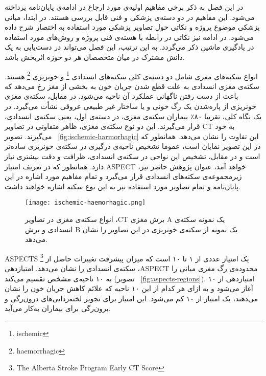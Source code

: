

در این فصل به ذکر برخی مفاهیم اولیه‌ی مورد ارجاع در ادامه‌ی پایان‌نامه پرداخته می‌شود.
این مفاهیم در دو دسته‌ی پزشکی و فنی قابل بررسی هستند.
در ابتدا، مبانی پزشکی موضوع پروژه و نکاتی حول تصاویر پزشکی مورد استفاده به اختصار شرح داده می‌شود.
در ادامه نیز نکاتی در رابطه با هسته‌ی فنی پروژه و روش‌های مورد استفاده در یادگیری ماشین ذکر می‌گردد.
به این ترتیب، این فصل می‌تواند در دست‌یابی به یک دانش مشترک در میان متخصصان هر دو حوزه اثربخش باشد.



انواع سکته‌های مغزی شامل دو دسته‌ی کلی سکته‌های انسدادی
\footnote{ischemic}
و خونریزی
\footnote{haemorrhagic} 
هستند.
سکته‌ی مغزی انسدادی به علت قطع شدن جریان خون به بخشی از مغز رخ می‌دهد که باعث از دست رفتن ناگهانی عملکرد آن ناحیه می‌شود.
در مقابل، سکته‌ی مغزی خونریزی از پاره‌شدن یک رگ خونی و یا ساختار غیر طبیعی عروقی نشأت می‌گیرد.
در یک نگاه کلی، تقریبا ۸۰٪ بیماران سکته‌ی مغزی، در دسته‌ی اول، یعنی سکته‌ی انسدادی، قرار می‌گیرند.
این دو نوع سکته‌ی مغزی، ظاهر متفاوتی در تصاویر CT به خود می‌گیرند.
تصویر ~\ref{fig:ischemic-harmorhagic} این تفاوت را نشان می‌دهد.
همانطور که در این تصویر نمایان است، عموما تشخیص ناحیه‌ی درگیری
در سکته‌ی خونریزی ساده‌تر است و در مقابل، تشخیص این نواحی در سکته‌ی انسدادی، ظرافت و دقت بیشتری نیاز دارد.
همانطور که در تعریف امتیاز ASPECT خواهد آمد، عنوان پژوهش حاضر نیز، زیرمجموعه‌ی 
سکته‌های انسدادی قرار می‌گیرد و تمام مفاهیم مورد اشاره در این پایان‌نامه و تمام تصاویر مورد استفاده نیز به این نوع سکته اشاره خواهند داشت.

\begin{figure}[ht]
\centering
\texttt{[image: ischemic-haemorhagic.png]}
\caption[]{انواع سکته‌ی مغزی در تصاویر ،CT برش مغزی A یک نمونه سکته‌ی انسدادی و برش B یک نمونه از سکته‌ی خونریزی در این تصاویر را نشان می‌دهد.}
\label{fig:ischemic-haemorrhagic}
\end{figure}
        

ASPECTS 
\footnote{The Alberta Stroke Program Early CT Score}
یک امتیاز عددی از ۱ تا ۱۰ است که میزان پیشرفت تغییرات حاصل از سکته‌ی انسدادی را 
نشان می‌دهد.
 امتیاز‌دهی ،ASPECT 
 محدوده‌ی رگ مغزی میانی را به ۱۰ ناحیه‌ی مشخص تقسیم می‌کند (تصویر ~\ref{fig:aspects-regions}).
 امتیازدهی  از ۱۰ آغاز می‌شود و به ازای هر کدام از این ۱۰ ناحیه که علائم کاهش جریان 
 خون را نشان می‌دهند، یک امتیاز از ۱۰ کم می‌شود.
 این امتیاز برای تجویز لخته‌زدایی‌های درون‌رگی و برون‌رگی برای بیماران به‌کار می‌آید.

